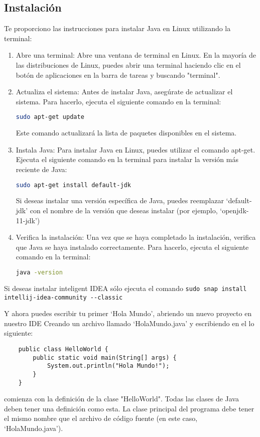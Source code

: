 \documentclass{article}
\begin{document}
\subsection{Instalación}
Te proporciono las instrucciones para instalar Java en Linux utilizando la terminal:
\begin{enumerate}
    \item Abre una terminal: Abre una ventana de terminal en Linux. En la mayoría de las distribuciones de Linux, puedes abrir una terminal haciendo clic en el botón de aplicaciones en la barra de tareas y buscando "terminal".
    \item Actualiza el sistema: Antes de instalar Java, asegúrate de actualizar el sistema. Para hacerlo, ejecuta el siguiente comando en la terminal:
\begin{lstlisting}[language=Bash]
sudo apt-get update    \end{lstlisting}
        Este comando actualizará la lista de paquetes disponibles en el sistema.
    \item Instala Java: Para instalar Java en Linux, puedes utilizar el comando apt-get. Ejecuta el siguiente comando en la terminal para instalar la versión más reciente de Java:
\begin{lstlisting}[language=Bash]
sudo apt-get install default-jdk\end{lstlisting}
Si deseas instalar una versión específica de Java, puedes reemplazar \enquote*{default-jdk} con el nombre de la versión que deseas instalar (por ejemplo, \enquote*{openjdk-11-jdk})
    \item Verifica la instalación: Una vez que se haya completado la instalación, verifica que Java se haya instalado correctamente. Para hacerlo, ejecuta el siguiente comando en la terminal:
\begin{lstlisting}[language=Bash]
java -version\end{lstlisting}
\end{enumerate}
Si deseas instalar inteligent IDEA sólo ejecuta el comando \lstinline{sudo snap install intellij-idea-community --classic}

Y ahora puedes escribir tu primer \enquote*{Hola Mundo}, abriendo un nuevo proyecto en nuestro IDE Creando un archivo llamado \enquote*{HolaMundo.java} y escribiendo en el lo siguiente:
\begin{lstlisting}
    public class HelloWorld {
        public static void main(String[] args) {
            System.out.println("Hola Mundo!");
        }
    }
\end{lstlisting}
    comienza con la definición de la clase "HelloWorld". Todas las clases de Java deben tener una definición como esta. La clase principal del programa debe tener el mismo nombre que el archivo de código fuente (en este caso, \enquote*{HolaMundo.java}).
\end{document}
